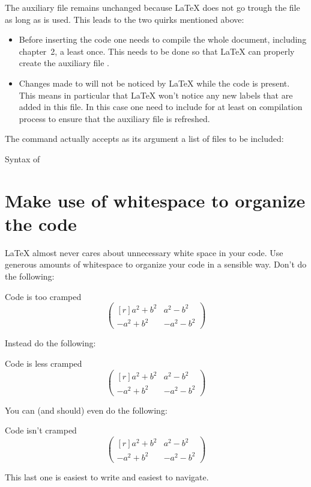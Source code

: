 The auxiliary file  remains unchanged because {\LaTeX} does not go trough the file  as long as  is used.
This leads to the two quirks mentioned above:
\begin{itemize}
  \item
    Before inserting the code  one needs to compile the whole document, including chapter~2, a least once.
    This needs to be done so that {\LaTeX} can properly create the auxiliary file .
  \item
    Changes made to  will not be noticed by {\LaTeX} while the code  is present.
    This means in particular that {\LaTeX} won’t notice any new labels that are added in this file.
    In this case one need to include  for at least on compilation process to ensure that the auxiliary file  is refreshed.
\end{itemize}

The command  actually accepts as its argument a list of files to be included:
\begin{showcode}{Syntax of }
  
\end{showcode}




\section{Make use of whitespace to organize the code}

{\LaTeX} almost never cares about unnecessary white space in your code.
Use generous amounts of whitespace to organize your code in a sensible way.
Don’t do the following:
\begin{showcode}{Code is too cramped}
\[\begin{pmatrix*}[r]a^2+b^2&a^2-b^2\\-a^2+b^2&-a^2-b^2\end{pmatrix*}\]
\end{showcode}
Instead do the following:
\begin{showcode}{Code is less cramped}
\[
  \begin{pmatrix*}[r]
     a^2 + b^2 &  a^2 - b^2 \\
    -a^2 + b^2 & -a^2 - b^2
  \end{pmatrix*}
\]
\end{showcode}
You can (and should) even do the following:
\begin{showcode}{Code isn’t cramped}
\[
  \begin{pmatrix*}[r]
    a^2 + b^2
    &
    a^2 - b^2
    \\
    - a^2 + b^2
    &
    - a^2 - b^2
  \end{pmatrix*}
\]
\end{showcode}
This last one is easiest to write and easiest to navigate.


